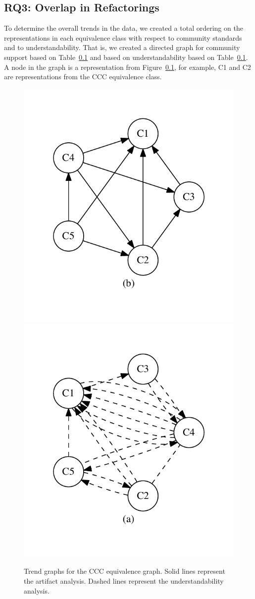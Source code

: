 \subsection{RQ3: Overlap in Refactorings}

To determine the overall trends in the data, we created a total ordering on the representations in each equivalence class  with respect to community standards and to understandability. That is, we created a directed graph for community support based on Table~\ref{} and based on understandability based on Table~\ref{}. A node in the graph is a representation from Figure~\ref{}, for example, C1 and C2 are representations from the CCC equivalence class.

\begin{figure}[tb]
\centering
\includegraphics[width=0.42\columnwidth]{graphs/cart.pdf}\includegraphics[width=0.57\columnwidth]{graphs/ccom.pdf}
\caption{Trend graphs for the CCC equivalence graph. Solid lines represent the artifact analysis. Dashed lines represent the understandability analysis.}
\label{fig:graphsforanalysis}
\end{figure}

